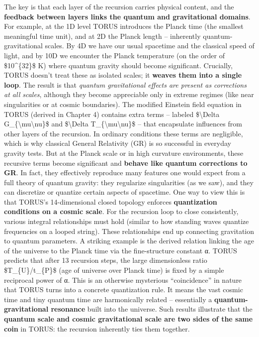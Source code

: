 The key is that each layer of the recursion carries physical content,
and the \textbf{feedback between layers links the quantum and
gravitational domains}. For example, at the 1D level TORUS introduces
the Planck time (the smallest meaningful time unit), and at 2D the
Planck length -- inherently quantum-gravitational scales. By 4D we have
our usual spacetime and the classical speed of light, and by 10D we
encounter the Planck temperature (on the order of \$10\^{}\{32\}\$ K)
where quantum gravity should become significant. Crucially, TORUS
doesn't treat these as isolated scales; it \textbf{weaves them into a
single loop}. The result is that \emph{quantum gravitational effects are
present as corrections at all scales}, although they become appreciable
only in extreme regimes (like near singularities or at cosmic
boundaries). The modified Einstein field equation in TORUS (derived in
Chapter 4) contains extra terms -- labeled \$\textbackslash{}Delta
G\_\{\textbackslash{}mu\textbackslash{}nu\}\$ and
\$\textbackslash{}Delta T\_\{\textbackslash{}mu\textbackslash{}nu\}\$ --
that encapsulate influences from other layers of the recursion​. In
ordinary conditions these terms are negligible, which is why classical
General Relativity (GR) is so successful in everyday gravity tests. But
at the Planck scale or in high curvature environments, these recursive
terms become significant and \textbf{behave like quantum corrections to
GR}. In fact, they effectively reproduce many features one would expect
from a full theory of quantum gravity: they regularize singularities (as
we saw), and they can discretize or quantize certain aspects of
spacetime. One way to view this is that TORUS's 14-dimensional closed
topology enforces \textbf{quantization conditions on a cosmic scale}.
For the recursion loop to close consistently, various integral
relationships must hold (similar to how standing waves quantize
frequencies on a looped string). These relationships end up connecting
gravitation to quantum parameters. A striking example is the derived
relation linking the age of the universe to the Planck time via the
fine-structure constant α. TORUS predicts that after 13 recursion steps,
the large dimensionless ratio \$T\_\{U\}/t\_\{P\}\$ (age of universe
over Planck time) is fixed by a simple reciprocal power of α​. This is
an otherwise mysterious ``coincidence'' in nature that TORUS turns into
a concrete quantization rule. It means the vast cosmic time and tiny
quantum time are harmonically related -- essentially a
\textbf{quantum-gravitational resonance} built into the universe. Such
results illustrate that the \textbf{quantum scale and cosmic
gravitational scale are two sides of the same coin} in TORUS: the
recursion inherently ties them together.

